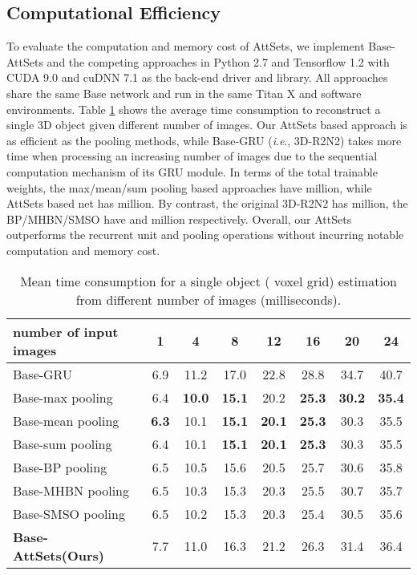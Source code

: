 \documentclass[twocolumn]{svjour3}    \pdfoutput=1
\newcommand{\nickname}{AttSets}
\newcommand{\ie}{\textit{i}.\textit{e}., }
\begin{document}
\vspace{-0.75cm}
\subsection{Computational Efficiency}
To evaluate the computation and memory cost of \nickname{}, we implement Base-AttSets and the competing approaches in Python 2.7 and Tensorflow 1.2 with CUDA 9.0 and cuDNN 7.1 as the back-end driver and library. All approaches share the same Base network and run in the same Titan X and software environments. Table \ref{tab:time_con} shows the average time consumption to reconstruct a single 3D object given different number of images. Our \nickname{} based approach is as efficient as the pooling methods, while Base-GRU (\ie 3D-R2N2) takes more time when processing an increasing number of images due to the sequential computation mechanism of its GRU module. In terms of the total trainable weights, the max/mean/sum pooling based approaches have  million, while \nickname{} based net has  million. By contrast, the original 3D-R2N2 has  million, the BP/MHBN/SMSO have  and  million respectively. Overall, our \nickname{} outperforms the recurrent unit and pooling operations without incurring notable computation and memory cost.

\begin{table}[t]
\caption{Mean time consumption for a single object ( voxel grid) estimation from different number of images (milliseconds).}
\centering
\label{tab:time_con}
\tabcolsep=0.02cm
\begin{tabular}{ l|ccccccc}
\hline
number of input images&1 &4 &8 &12 &16 &20 &24  \\
\hline
Base-GRU &6.9&11.2&17.0&22.8&28.8&34.7&40.7\\
Base-max pooling &6.4&\textbf{10.0}&\textbf{15.1}&20.2&\textbf{25.3}&\textbf{30.2}&\textbf{35.4}\\
Base-mean pooling &\textbf{6.3}&10.1&\textbf{15.1}&\textbf{20.1}&\textbf{25.3}&30.3&35.5 \\
Base-sum pooling &6.4&10.1&\textbf{15.1}&\textbf{20.1}&\textbf{25.3}&30.3&35.5 \\
Base-BP pooling &6.5 &10.5 & 15.6 & 20.5&25.7& 30.6&35.8 \\
Base-MHBN pooling &6.5 &10.3 & 15.3 & 20.3&25.5& 30.7&35.7 \\
Base-SMSO pooling &6.5 &10.2 & 15.3 & 20.3&25.4&30.5&35.6 \\
\textbf{Base-\nickname{}(Ours)} &7.7&11.0&16.3&21.2&26.3&31.4&36.4\\
\hline
\end{tabular}
\vspace{-0.2cm}
\end{table}
\end{document}
